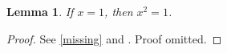 \documentclass{article}
\newtheorem{lemma}{Lemma}
\begin{document}
\begin{lemma}\label{lem:one}If $x=1$, then $x^2=1$.\end{lemma}
\begin{proof}See \ref{missing} and \cite{unknown}. Proof omitted.\end{proof}
\end{document}
